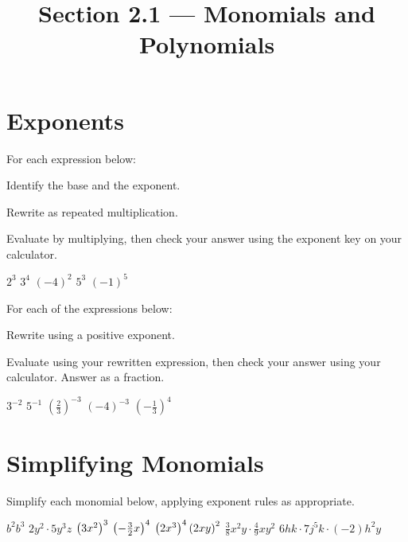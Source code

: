 

\title{Section 2.1 --- Monomials and Polynomials}


\maketitle
\section*{Exponents}
For each expression below:
\begin{clist}
\item Identify the base and the exponent.
\item Rewrite as repeated multiplication.
\item Evaluate by multiplying, then check your answer using the exponent key on your calculator.
\end{clist}
\begin{smenum}
\mitemxxxxx
{$2^3$}
{$3^4$}
{$(-4)^2$}
{$5^3$}
{$(-1)^5$}
\end{smenum}
For each of the expressions below:
\begin{clist}
\item Rewrite using a positive exponent.
\item Evaluate using your rewritten expression, then check your answer using your calculator. Answer as a fraction.
\end{clist}
\begin{smenum}
\mitemxxxxx
{$3^{-2}$}
{$5^{-1}$}
{$\left(\frac{2}{3}\right)^{-3}$}
{$(-4)^{-3}$}
{$\left(-\frac{1}{3}\right)^4$}
\end{smenum}

\section*{Simplifying Monomials}
Simplify each monomial below, applying exponent rules as appropriate.
\begin{smenum}
\mitemxxxx
{$b^2b^3$}
{$2y^2\cdot 5y^3z$}
{$\left(3x^2\right)^3$}
{$\left(-\frac{3}{2}x\right)^4$}
\mitemxxxo
{$\left(2x^3\right)^{4}\left(2xy\right)^2$}
{$\frac{3}{8}x^2y\cdot\frac{4}{9}xy^2$}
{$6hk\cdot 7j^5k\cdot(-2)h^2y$}
\end{smenum}

